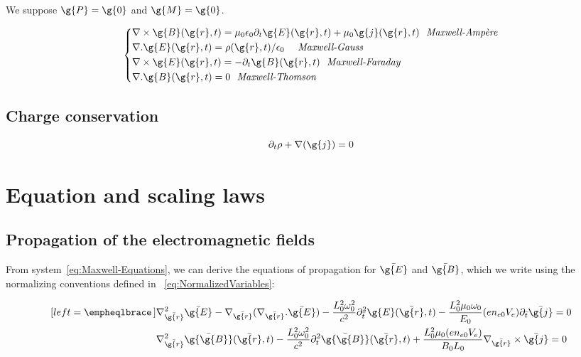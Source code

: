 \noindent We suppose $\g{P} = \g{0}$ and $\g{M} = \g{0}$.

\begin{equation}
\label{eq:Maxwell-Equations}
  \left\{
      \begin{aligned}
     & \nabla \times \g{B}(\g{r},t) = \mu_0\epsilon_0 \partial_t \g{E}(\g{r},t)  + \mu_0 \g{j}(\g{r},t)  \ \ \rm{\textit{Maxwell-Ampère}}\\
     & \nabla . \g{E}(\g{r},t) = \rho(\g{r},t)/\epsilon_0 \ \ \ \ \rm{\textit{Maxwell-Gauss}}\\
     & \nabla\times \g{E}(\g{r},t) = - \partial_t \g{B}(\g{r},t)\ \ \rm{\textit{Maxwell-Faraday}}\\ 
    & \nabla .\g{ B}(\g{r},t) = 0\ \ \rm{\textit{Maxwell-Thomson}}\\
      \end{aligned}
    \right.
\end{equation}

\subsection{Charge conservation}

\begin{equation}
\partial_t\rho + \nabla (\g{j}) = 0
\end{equation}

\section{Equation and scaling laws}

\subsection{Propagation of the electromagnetic fields}

\noindent From system~\ref{eq:Maxwell-Equations}, we can derive the equations of propagation for $\bar{\g{E}}$ and $\bar{\g{B}}$, which we write using the normalizing conventions defined in ~\ref{eq:NormalizedVariables}:


\begin{subequations}
\label{eq:Maxwell_NoDimension}
\begin{align}[left = \empheqlbrace\,]
&\nabla_{\bar{\g{r}}}^2 \bar{\g{E }}- \nabla_{\bar{\g{r}}} ( \nabla_{\bar{\g{r}}}. \bar{\g{E}})  - \frac{L_0^2 \omega_0^2}{c^2} \partial_{\bar{t}}^2 \g{E}(\bar{\g{r}},t)  -\frac{ L_0^2 \mu_0\omega_0}{E_0}(en_{e0}V_e)\partial_{\bar{t}}\bar{\g{j}}=0\label{eq:EMaxwell_NoDimension}  \\
&\nabla_{\bar{\g{r}}}^2 \bar{\g{\g{B}}}(\bar{\g{r}},t) - \frac{L_0^2\omega_0^2}{c^2}\partial_{t}^2 \bar{\g{\g{B}}}(\bar{\g{r}},t)  + \frac{L_0^2\mu_0(en_{e0}V_e)}{B_0L_0}\nabla_{\bar{\g{r}}} \times \bar{\g{j}}=0\label{eq:BMaxwell_NoDimension}
\end{align}
\end{subequations}

